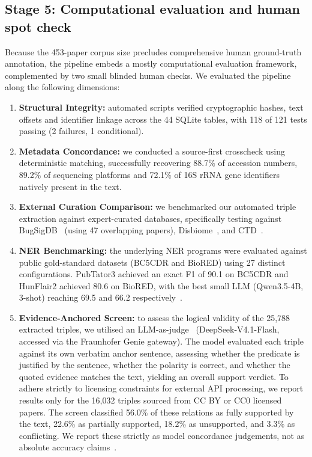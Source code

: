\documentclass[referee,lineno,pdflatex,sn-vancouver-num]{sn-jnl}
\theoremstyle{thmstyleone}%
\theoremstyle{thmstyletwo}%
\theoremstyle{thmstylethree}%
\begin{document}
\subsection{Stage 5: Computational evaluation and human spot check}\label{sec:stage5}

Because the 453-paper corpus size precludes comprehensive human
ground-truth annotation, the pipeline embeds a mostly computational
evaluation framework, complemented by two small blinded human checks. We
evaluated the pipeline along the following dimensions:

\begin{enumerate}
\item \textbf{Structural Integrity:} automated scripts verified
cryptographic hashes, text offsets and identifier linkage across the 44
SQLite tables, with 118 of 121 tests passing (2 failures, 1 conditional).

\item \textbf{Metadata Concordance:} we conducted a source-first crosscheck
using deterministic matching, successfully recovering 88.7\% of accession
numbers, 89.2\% of sequencing platforms and 72.1\% of 16S rRNA gene identifiers
natively present in the text.

\item \textbf{External Curation Comparison:} we benchmarked our automated
triple extraction against expert-curated databases, specifically testing
against BugSigDB~\cite{geistlinger2023} (using 47 overlapping papers),
Disbiome~\cite{janssens2018disbiome}, and CTD~\cite{davis2026ctd}.

\item \textbf{NER Benchmarking:} the underlying NER programs were evaluated
against public gold-standard datasets (BC5CDR and BioRED) using 27 distinct
configurations. PubTator3 achieved an exact F1 of 90.1 on BC5CDR and
HunFlair2 achieved 80.6 on BioRED, with the best small LLM (Qwen3.5-4B,
3-shot) reaching 69.5 and 66.2 respectively~\cite{wei2024pubtator3,
sanger2024hunflair2,qwen35card}.

\item \textbf{Evidence-Anchored Screen:} to assess the logical validity of
the 25,788 extracted triples, we utilised an
LLM-as-judge~\cite{zheng2023mtbench} (DeepSeek-V4.1-Flash, accessed via the
Fraunhofer Genie gateway). The model evaluated each triple against its own
verbatim anchor sentence, assessing whether the predicate is justified by
the sentence, whether the polarity is correct, and whether the quoted
evidence matches the text, yielding an overall support verdict. To adhere
strictly to licensing constraints for external API processing, we report
results only for the 16,032 triples sourced from CC BY or CC0 licensed
papers. The screen classified 56.0\% of these relations as fully supported
by the text, 22.6\% as partially supported, 18.2\% as unsupported, and
3.3\% as conflicting. We report these strictly as model concordance
judgements, not as absolute accuracy
claims~\cite{chen2025llmbench,deepseekv41card}.


\end{enumerate}
\end{document}
